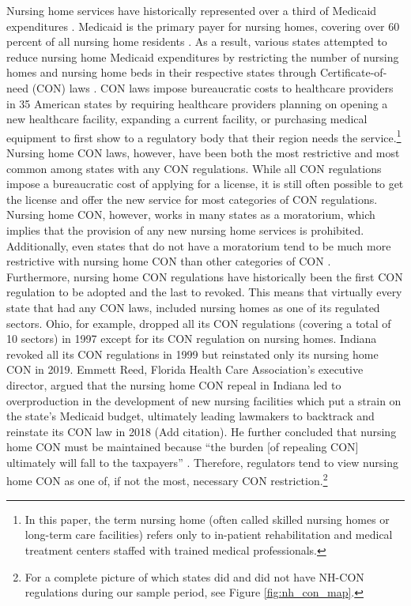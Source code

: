 \documentclass[../Main.tex]{subfiles}
\begin{document}
Nursing home services have historically represented over a third of Medicaid expenditures \citep{wiener1999controlling}. Medicaid is the primary payer for nursing homes, covering over 60 percent of all nursing home residents . As a result, various states attempted to reduce nursing home Medicaid expenditures by restricting the number of nursing homes and nursing home beds in their respective states through Certificate-of-need (CON) laws \citep{feder1980regulating,grabowski2003effects,rahman2016impact}. CON laws impose bureaucratic costs to healthcare providers in 35 American states by requiring healthcare providers planning on opening a new healthcare facility, expanding a current facility, or purchasing medical equipment to first show to a regulatory body that their region needs the service.\footnote{In this paper, the term nursing home (often called skilled nursing homes or long-term care facilities) refers only to in-patient rehabilitation and medical treatment centers staffed with trained medical professionals.}\\
\indent Nursing home CON laws, however, have been both the most restrictive and most common among states with any CON regulations. While all CON regulations impose a bureaucratic cost of applying for a license, it is still often possible to get the license and offer the new service for most categories of CON regulations.  Nursing home CON, however, works in many states as a moratorium, which implies that the provision of any new nursing home services is prohibited. Additionally, even states that do not have a moratorium tend to be much more restrictive with nursing home CON than other categories of CON \citep{american2020american}.\\
\indent Furthermore, nursing home CON regulations have historically been the first CON regulation to be adopted and the last to revoked. This means that virtually every state that had any CON laws, included nursing homes as one of its regulated sectors. Ohio, for example, dropped all its CON regulations (covering a total of 10 sectors) in 1997 except for its CON regulation on nursing homes. Indiana revoked all its CON regulations in 1999 but reinstated only its nursing home CON in 2019. Emmett Reed, Florida Health Care Association’s executive director, argued that the nursing home CON repeal in Indiana led to overproduction in the development of new nursing facilities which put a strain on the state’s Medicaid budget, ultimately leading lawmakers to backtrack and reinstate its CON law in 2018 (Add citation). He further concluded that nursing home CON must be maintained because “the burden [of repealing CON] ultimately will fall to the taxpayers” \citep{sexton2019conrepeal}. Therefore, regulators tend to view nursing home CON as one of, if not the most, necessary CON restriction.\footnote{For a complete picture of which states did and did not have NH-CON regulations during our sample period, see Figure \ref{fig:nh_con_map}.}\\
\end{document}
